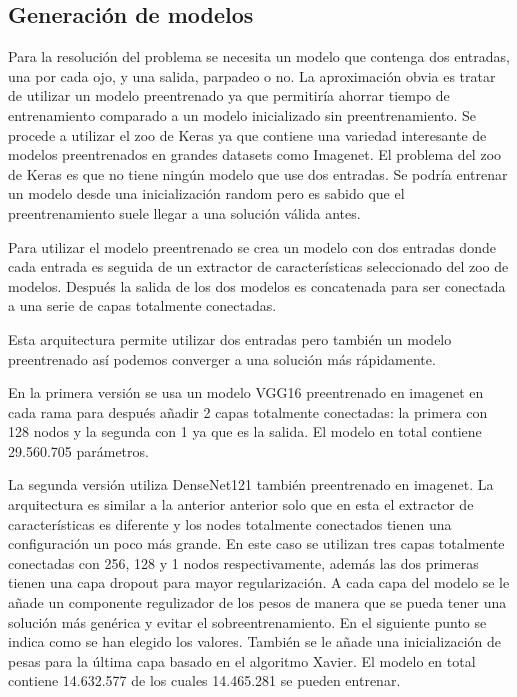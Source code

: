 \documentclass[12pt]{article}
\begin{document}
    \subsection*{Generación de modelos}
    Para la resolución del problema se necesita un modelo que contenga dos entradas, una por cada ojo, y una salida,
    parpadeo o no.
    La aproximación obvia es tratar de utilizar un modelo preentrenado ya que permitiría ahorrar tiempo de
    entrenamiento comparado a un modelo inicializado sin preentrenamiento.
    Se procede a utilizar el zoo de Keras\cite{keras_applications}    ya que contiene una variedad interesante de
    modelos preentrenados en grandes datasets como Imagenet.
    El problema del zoo de Keras es que no tiene ningún modelo que use dos entradas.
    Se podría entrenar un modelo desde una inicialización random pero es sabido que el preentrenamiento suele llegar
    a una solución válida antes.

    Para utilizar el modelo preentrenado se crea un modelo con dos entradas donde cada entrada es seguida de un
    extractor de características seleccionado del zoo de modelos.
    Después la salida de los dos modelos es concatenada para ser conectada a una serie de capas totalmente conectadas.

    Esta arquitectura permite utilizar dos entradas pero también un modelo preentrenado así podemos converger a una
    solución más rápidamente.

    En la primera versión se usa un modelo VGG16 preentrenado en imagenet en cada rama para después añadir 2 capas
    totalmente conectadas: la primera con 128 nodos y la segunda con 1 ya que es la salida.
    El modelo en total contiene 29.560.705 parámetros.

    La segunda versión utiliza DenseNet121 también preentrenado en imagenet.
    La arquitectura es similar a la anterior anterior solo que en esta el extractor de características es diferente y
    los nodes totalmente conectados tienen una configuración un poco más grande.
    En este caso se utilizan tres capas totalmente conectadas con 256, 128 y 1 nodos respectivamente, además las dos
    primeras tienen una capa dropout para mayor regularización.
    A cada capa del modelo se le añade un componente regulizador de los pesos de manera que se pueda tener una solución
    más genérica y evitar el sobreentrenamiento.
    En el siguiente punto se indica como se han elegido los valores.
    También se le añade una inicialización de pesas para la última capa basado en el algoritmo Xavier\cite{Xavier_init}.
    El modelo en total contiene 14.632.577 de los cuales 14.465.281 se pueden entrenar.
\end{document}
